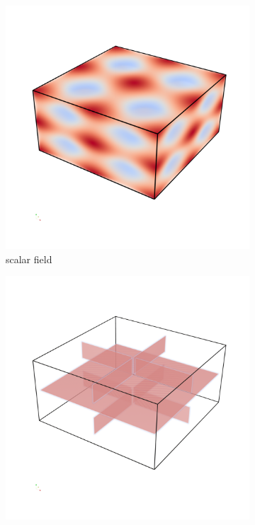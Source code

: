 \begin{figure}[t]
    \begin{subfigure}[b]{0.49\textwidth}
        \includegraphics[trim=0 350 0 300, clip=true, width=\textwidth]{Images/sfield.png}
        \caption{scalar field}
        \label{fig:sfield}
    \end{subfigure}
    \begin{subfigure}[b]{0.49\textwidth}
        \includegraphics[trim=0 380 0 380, clip=true, width=\textwidth]{Images/ridge.png}

\end{subfigure}
\end{figure}
